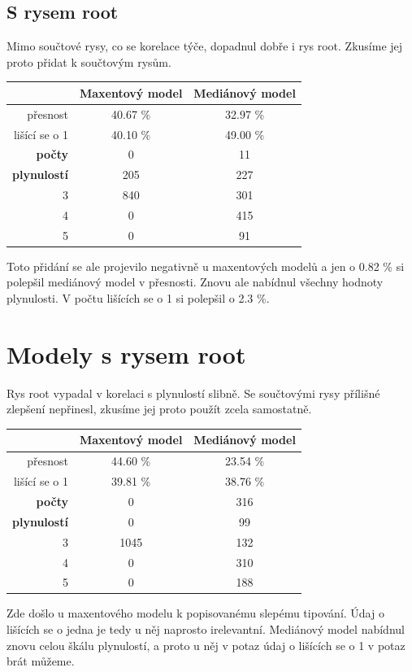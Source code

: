 \documentclass[12pt,a4paper]{report}
\begin{document}
\subsection{S rysem root}
Mimo součtové rysy, co se korelace týče, dopadnul dobře i rys root. Zkusíme jej proto přidat k součtovým rysům.
\begin{center}
\begin{tabular}{|r|c|c|}
\hline
 & \textbf{Maxentový model} & \textbf{Mediánový model} \\
 \hline
     přesnost & 40.67 \%  & 32.97 \%  \\
\hline
lišící se o 1 & 40.10 \% & 49.00 \%  \\
\hline
     \textbf{počty} \quad 1 & \color{red}0   & \color{OliveGreen}11   \\
\textbf{plynulostí} \quad 2 & 205 & \color{OliveGreen}227   \\
                          3 & 840 & \color{OliveGreen}301 \\
                          4 & \color{red}0   & \color{OliveGreen}415 \\
                          5 & \color{red}0   & \color{OliveGreen}91  \\
\hline
\end{tabular}
\end{center}
Toto přidání se ale projevilo negativně u maxentových modelů a jen o 0.82 \% si polepšil mediánový model v přesnosti. Znovu ale nabídnul všechny hodnoty plynulosti. V počtu lišících se o 1 si polepšil o 2.3 \%.


\section{Modely s rysem root}
Rys root vypadal v korelaci s plynulostí slibně. Se součtovými rysy přílišné zlepšení nepřinesl, zkusíme jej proto použít zcela samostatně.
\begin{center}
\begin{tabular}{|r|c|c|}
\hline
 & \textbf{Maxentový model} & \textbf{Mediánový model} \\
 \hline
     přesnost & 44.60 \%  & 23.54 \%  \\
\hline
lišící se o 1 & 39.81 \% & 38.76 \%  \\
\hline
     \textbf{počty} \quad 1 & \color{red}0   & \color{OliveGreen}316   \\
\textbf{plynulostí} \quad 2 & \color{red}0 & \color{OliveGreen}99   \\
                          3 & 1045 & \color{OliveGreen}132 \\
                          4 & \color{red}0   & \color{OliveGreen}310 \\
                          5 & \color{red}0   & \color{OliveGreen}188  \\
\hline
\end{tabular}
\end{center}
Zde došlo u maxentového modelu k popisovanému slepému tipování. Údaj o lišících se o jedna je tedy u něj naprosto irelevantní. Mediánový model nabídnul znovu celou škálu plynulostí, a proto u něj v potaz údaj o lišících se o 1 v potaz brát můžeme.
\end{document}
